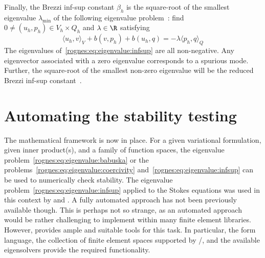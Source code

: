 Finally, the Brezzi inf-sup constant $\beta_h$ is the square-root of
the smallest eigenvalue $\lambda_{\min}$ of the following eigenvalue
problem~\citep{Malkus1981, Qin1994}: find $0 \not = (u_h, p_h) \in V_h
\times Q_h$ and $\lambda \in \R$ satisfying
\begin{equation}
  \label{rognes:eq:eigenvalue:infsup}
  \langle u_h, v \rangle_{V} + b(v, p_h) + b(u_h, q) = - \lambda
  \langle p_h, q \rangle_{Q}
\end{equation}
The eigenvalues of~\eqref{rognes:eq:eigenvalue:infsup} are all non-negative.
Any eigenvector associated with a zero eigenvalue corresponds to a
spurious mode. Further, the square-root of the smallest non-zero
eigenvalue will be the reduced Brezzi inf-sup
constant~\citep{Qin1994}.

\section{Automating the stability testing}
\label{rognes:sec:automation}

The mathematical framework is now in place. For a given variational
formulation, given inner product(s), and a family of function spaces,
the eigenvalue problem~\eqref{rognes:eq:eigenvalue:babuska}
or the problems~\eqref{rognes:eq:eigenvalue:coercivity}
and~\eqref{rognes:eq:eigenvalue:infsup} can be used to numerically check
stability. The eigenvalue problem~\eqref{rognes:eq:eigenvalue:infsup}
applied to the Stokes equations was used in this context by
\citet{Qin1994} and \citet{ChapelleBathe1993}. A fully automated approach
has not been previously available though. This is perhaps not so strange,
as an automated approach would be rather challenging to implement within
many finite element libraries. However, \pydolfin{} provides ample and
suitable tools for this task. In particular, the \ufl{} form language,
the collection of finite element spaces supported by \fiat{}/\ffc{}, and
the available \slepc{} eigensolvers provide the required functionality.

